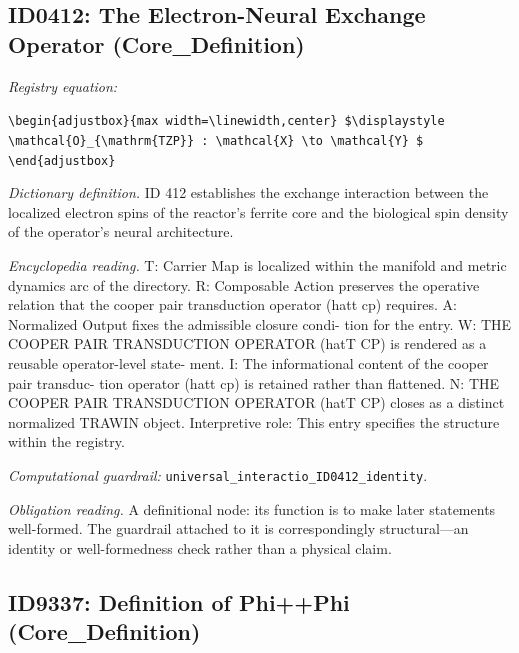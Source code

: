 \documentclass[11pt]{article}
\theoremstyle{remark}
\begin{document}
\subsection{ID0412: The Electron-Neural Exchange Operator (Core\_Definition)}

\noindent\textit{Registry equation:}\par
{\small\texttt{\textbackslash{}begin\{adjustbox\}\{max width=\textbackslash{}linewidth,center\} \$\textbackslash{}displaystyle \textbackslash{}mathcal\{O\}\_\{\textbackslash{}mathrm\{TZP\}\} : \textbackslash{}mathcal\{X\} \textbackslash{}to \textbackslash{}mathcal\{Y\} \$ \textbackslash{}end\{adjustbox\}}}\par\medskip
\noindent\textit{Dictionary definition.} ID 412 establishes the exchange interaction between the localized electron spins of the reactor's ferrite core and the biological spin density of the operator's neural architecture.\par\medskip
\noindent\textit{Encyclopedia reading.} T: Carrier Map is localized within the manifold and metric dynamics arc of the directory. R: Composable Action preserves the operative relation that the cooper pair transduction operator (hatt cp) requires. A: Normalized Output fixes the admissible closure condi- tion for the entry. W: THE COOPER PAIR TRANSDUCTION OPERATOR (hatT CP) is rendered as a reusable operator-level state- ment. I: The informational content of the cooper pair transduc- tion operator (hatt cp) is retained rather than flattened. N: THE COOPER PAIR TRANSDUCTION OPERATOR (hatT CP) closes as a distinct normalized TRAWIN object. Interpretive role: This entry specifies the structure within the registry.
\par\medskip\noindent\textit{Computational guardrail:} \texttt{universal\_interactio\_ID0412\_identity}.
\par\medskip\noindent\textit{Obligation reading.} A definitional node: its function is to make later statements well-formed. The guardrail attached to it is correspondingly structural---an identity or well-formedness check rather than a physical claim.

\subsection{ID9337: Definition of Phi++Phi (Core\_Definition)}
\end{document}
